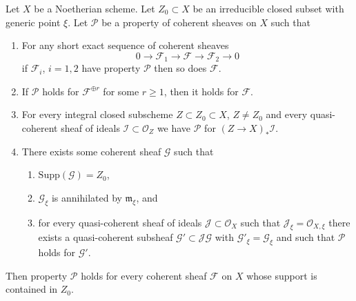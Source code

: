\begin{lemma}
\label{lemma-property-irreducible-higher-rank-cohomological}
Let $X$ be a Noetherian scheme. Let $Z_0 \subset X$ be an irreducible
closed subset with generic point $\xi$. Let $\mathcal{P}$ be a property
of coherent sheaves on $X$ such that
\begin{enumerate}
\item For any short exact sequence of coherent sheaves
$$
0 \to \mathcal{F}_1 \to \mathcal{F} \to \mathcal{F}_2 \to 0
$$
if $\mathcal{F}_i$, $i = 1, 2$ have property $\mathcal{P}$
then so does $\mathcal{F}$.
\item If $\mathcal{P}$ holds for $\mathcal{F}^{\oplus r}$ for
some $r \geq 1$, then it holds for $\mathcal{F}$.
\item For every integral closed subscheme $Z \subset Z_0 \subset X$,
$Z \not = Z_0$ and every quasi-coherent sheaf of ideals
$\mathcal{I} \subset \mathcal{O}_Z$ we have
$\mathcal{P}$ for $(Z \to X)_*\mathcal{I}$.
\item There exists some coherent sheaf $\mathcal{G}$ such that
\begin{enumerate}
\item $\text{Supp}(\mathcal{G}) = Z_0$,
\item $\mathcal{G}_\xi$ is annihilated by $\mathfrak m_\xi$, and
\item for every quasi-coherent sheaf of ideals
$\mathcal{J} \subset \mathcal{O}_X$ such that
$\mathcal{J}_\xi = \mathcal{O}_{X, \xi}$ there exists a quasi-coherent
subsheaf $\mathcal{G}' \subset \mathcal{J}\mathcal{G}$ with
$\mathcal{G}'_\xi = \mathcal{G}_\xi$ and such that
$\mathcal{P}$ holds for $\mathcal{G}'$.
\end{enumerate}
\end{enumerate}
Then property $\mathcal{P}$ holds for every coherent sheaf
$\mathcal{F}$ on $X$ whose support is contained in $Z_0$.
\end{lemma}


